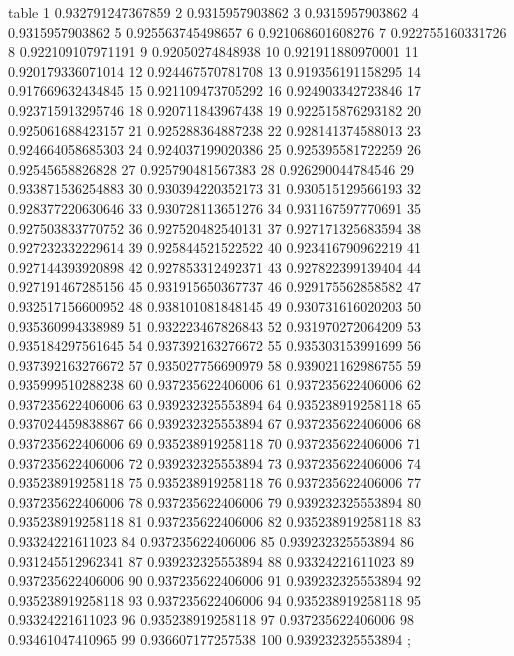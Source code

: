 table {%
	1 0.932791247367859
	2 0.9315957903862
	3 0.9315957903862
	4 0.9315957903862
	5 0.925563745498657
	6 0.921068601608276
	7 0.922755160331726
	8 0.922109107971191
	9 0.92050274848938
	10 0.921911880970001
	11 0.920179336071014
	12 0.924467570781708
	13 0.919356191158295
	14 0.917669632434845
	15 0.921109473705292
	16 0.924903342723846
	17 0.923715913295746
	18 0.920711843967438
	19 0.922515876293182
	20 0.925061688423157
	21 0.925288364887238
	22 0.928141374588013
	23 0.924664058685303
	24 0.924037199020386
	25 0.925395581722259
	26 0.92545658826828
	27 0.925790481567383
	28 0.926290044784546
	29 0.933871536254883
	30 0.930394220352173
	31 0.930515129566193
	32 0.928377220630646
	33 0.930728113651276
	34 0.931167597770691
	35 0.927503833770752
	36 0.927520482540131
	37 0.927171325683594
	38 0.927232332229614
	39 0.925844521522522
	40 0.923416790962219
	41 0.927144393920898
	42 0.927853312492371
	43 0.927822399139404
	44 0.927191467285156
	45 0.931915650367737
	46 0.929175562858582
	47 0.932517156600952
	48 0.938101081848145
	49 0.930731616020203
	50 0.935360994338989
	51 0.932223467826843
	52 0.931970272064209
	53 0.935184297561645
	54 0.937392163276672
	55 0.935303153991699
	56 0.937392163276672
	57 0.935027756690979
	58 0.939021162986755
	59 0.935999510288238
	60 0.937235622406006
	61 0.937235622406006
	62 0.937235622406006
	63 0.939232325553894
	64 0.935238919258118
	65 0.937024459838867
	66 0.939232325553894
	67 0.937235622406006
	68 0.937235622406006
	69 0.935238919258118
	70 0.937235622406006
	71 0.937235622406006
	72 0.939232325553894
	73 0.937235622406006
	74 0.935238919258118
	75 0.935238919258118
	76 0.937235622406006
	77 0.937235622406006
	78 0.937235622406006
	79 0.939232325553894
	80 0.935238919258118
	81 0.937235622406006
	82 0.935238919258118
	83 0.93324221611023
	84 0.937235622406006
	85 0.939232325553894
	86 0.931245512962341
	87 0.939232325553894
	88 0.93324221611023
	89 0.937235622406006
	90 0.937235622406006
	91 0.939232325553894
	92 0.935238919258118
	93 0.937235622406006
	94 0.935238919258118
	95 0.93324221611023
	96 0.935238919258118
	97 0.937235622406006
	98 0.93461047410965
	99 0.936607177257538
	100 0.939232325553894
};
